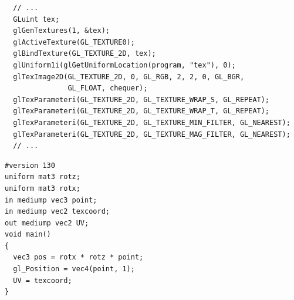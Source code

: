 \documentclass[calcdimensions,landscape,letterpaper]{powersem}
\newcommand{\thecurrentheading}{}
\newcommand{\heading}[1]{\renewcommand{\thecurrentheading}{#1}}
\begin{document}
\begin{slide}
    \heading{2x2 Texture Setup}
    \begin{center}
        \begin{minipage}[c]{\textwidth}
            \begin{verbatim}
  // ...
  GLuint tex;
  glGenTextures(1, &tex);
  glActiveTexture(GL_TEXTURE0);
  glBindTexture(GL_TEXTURE_2D, tex);
  glUniform1i(glGetUniformLocation(program, "tex"), 0);
  glTexImage2D(GL_TEXTURE_2D, 0, GL_RGB, 2, 2, 0, GL_BGR,
               GL_FLOAT, chequer);
  glTexParameteri(GL_TEXTURE_2D, GL_TEXTURE_WRAP_S, GL_REPEAT);
  glTexParameteri(GL_TEXTURE_2D, GL_TEXTURE_WRAP_T, GL_REPEAT);
  glTexParameteri(GL_TEXTURE_2D, GL_TEXTURE_MIN_FILTER, GL_NEAREST);
  glTexParameteri(GL_TEXTURE_2D, GL_TEXTURE_MAG_FILTER, GL_NEAREST);
  // ...
            \end{verbatim}
        \end{minipage}
    \end{center}
\end{slide}

\begin{slide}
    \heading{Textured Quad}
    \begin{center}
    \end{center}
\end{slide}

\begin{slide}
    \heading{3D Rotations}
    \begin{center}
        \begin{minipage}[c]{.5\textwidth}
            \begin{verbatim}
#version 130
uniform mat3 rotz;
uniform mat3 rotx;
in mediump vec3 point;
in mediump vec2 texcoord;
out mediump vec2 UV;
void main()
{
  vec3 pos = rotx * rotz * point;
  gl_Position = vec4(point, 1);
  UV = texcoord;
}
            \end{verbatim}
        \end{minipage}
    \end{center}
\end{slide}
\end{document}
